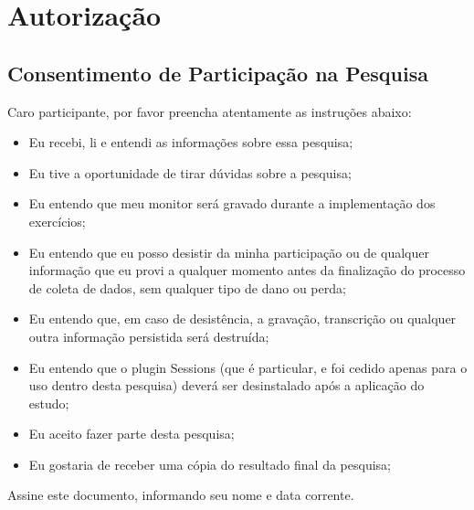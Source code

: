 \chapter{Autorização}
\label{ape:autorizacao}

\section{Consentimento de Participação na Pesquisa}

Caro participante, por favor preencha atentamente as instruções abaixo:

\begin{itemize}
  \item Eu recebi, li e entendi as informações sobre essa pesquisa;
  \item Eu tive a oportunidade de tirar dúvidas sobre a pesquisa;
  \item Eu entendo que meu monitor será gravado durante a implementação dos exercícios;
  \item Eu entendo que eu posso desistir da minha participação ou de
  qualquer informação que eu provi a qualquer momento antes da finalização do processo de
  coleta de dados, sem qualquer tipo de dano ou perda;
  \item Eu entendo que, em caso de desistência, a gravação, transcrição ou
  qualquer outra informação persistida será destruída;
  \item Eu entendo que o plugin Sessions (que é particular, e foi cedido apenas para o uso dentro desta 
	pesquisa) deverá ser desinstalado após a aplicação do estudo;
  \item Eu aceito fazer parte desta pesquisa;
  \item Eu gostaria de receber uma cópia do resultado final da pesquisa;
\end{itemize}

Assine este documento, informando seu nome e data corrente.